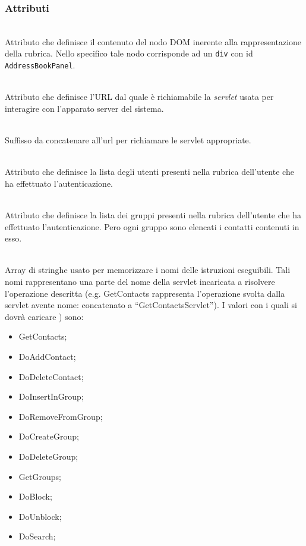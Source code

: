 \subsubsection*{Attributi}
\begin{description}

  \item{}\\
  Attributo che definisce il contenuto del nodo DOM inerente alla rappresentazione della rubrica. Nello specifico tale nodo corrisponde ad un \texttt{div} con id \texttt{AddressBookPanel}.
  \item{}\\
  Attributo che definisce l'URL dal quale è richiamabile la \textit{servlet} usata per interagire con l'apparato server del sistema.
  \item{}\\
Suffisso da concatenare all'url per richiamare le servlet appropriate.  
  \item{}\\
  Attributo che definisce la lista degli utenti presenti nella rubrica dell'utente che ha effettuato l'autenticazione.
   \item{}\\
  Attributo che definisce la lista dei gruppi presenti nella rubrica dell'utente che ha effettuato l'autenticazione. Pero ogni gruppo sono  elencati i contatti contenuti in esso.
   \item{}\\ 
   Array di stringhe usato per memorizzare i nomi delle istruzioni eseguibili. Tali nomi rappresentano una parte del nome della servlet incaricata a risolvere l'operazione descritta (e.g. GetContacts rappresenta l'operazione svolta dalla servlet avente nome:  concatenato a ``GetContactsServlet''). I valori con i quali si dovrà caricare ) sono:
   \begin{itemize}
   	\item GetContacts;
    \item DoAddContact;
    \item DoDeleteContact;
    \item DoInsertInGroup;
    \item DoRemoveFromGroup;
    \item DoCreateGroup;
    \item DoDeleteGroup;
    \item GetGroups;
    \item DoBlock;
    \item DoUnblock;
    \item DoSearch;
   \end{itemize}

\end{description}


